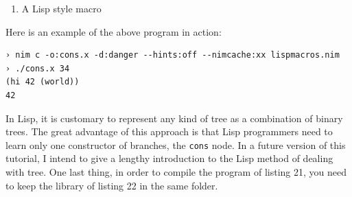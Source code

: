 \documentclass[
  12pt,
]{book}
\providecommand{\tightlist}{%
  \setlength{\itemsep}{0pt}\setlength{\parskip}{0pt}}
\begin{document}
\begin{enumerate}
\def\labelenumi{(\arabic{enumi})}
\setcounter{enumi}{20}
\tightlist
\item
  A Lisp style macro
\end{enumerate}

Here is an example of the above program in action:

\begin{verbatim}
› nim c -o:cons.x -d:danger --hints:off --nimcache:xx lispmacros.nim
› ./cons.x 34
(hi 42 (world))
42
\end{verbatim}

In Lisp, it is customary to represent any kind of tree as a combination
of binary trees. The great advantage of this approach is that Lisp
programmers need to learn only one constructor of branches, the
\texttt{cons} node. In a future version of this tutorial, I intend to
give a lengthy introduction to the Lisp method of dealing with tree. One
last thing, in order to compile the program of listing 21, you need to
keep the library of listing 22 in the same folder.

\pagebreak
\end{document}
